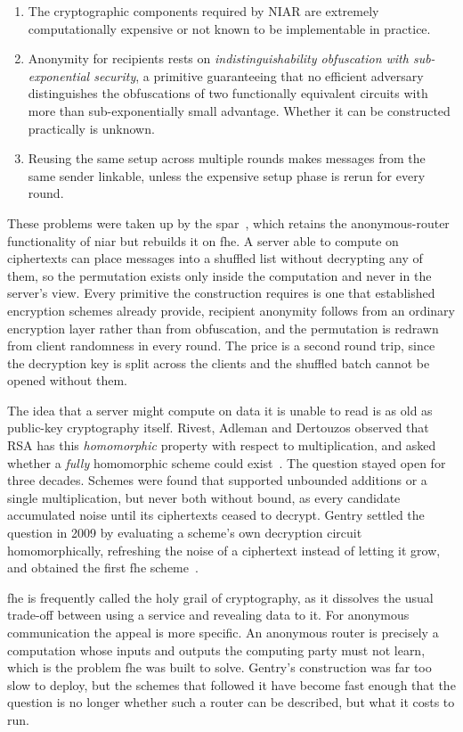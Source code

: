 \begin{enumerate}
    \item The cryptographic components required by NIAR are extremely computationally expensive or not known to be implementable in practice.
    \item Anonymity for recipients rests on \emph{indistinguishability obfuscation with sub-exponential security}, a primitive guaranteeing that no efficient adversary distinguishes the obfuscations of two functionally equivalent circuits with more than sub-exponentially small advantage. Whether it can be constructed practically is unknown.
    \item Reusing the same setup across multiple rounds makes messages from the same sender linkable, unless the expensive setup phase is rerun for every round.
\end{enumerate}

These problems were taken up by the \gls{spar}~\cite{cryptoeprint:2025/860}, which retains the anonymous-router functionality of \gls{niar} but rebuilds it on \gls{fhe}. A server able to compute on ciphertexts can place messages into a shuffled list without decrypting any of them, so the permutation exists only inside the computation and never in the server's view. Every primitive the construction requires is one that established encryption schemes already provide, recipient anonymity follows from an ordinary encryption layer rather than from obfuscation, and the permutation is redrawn from client randomness in every round. The price is a second round trip, since the decryption key is split across the clients and the shuffled batch cannot be opened without them.

The idea that a server might compute on data it is unable to read is as old as public-key cryptography itself. Rivest, Adleman and Dertouzos observed that RSA has this \emph{homomorphic} property with respect to multiplication, and asked whether a \emph{fully} homomorphic scheme could exist~\cite{rivest:1978:databanks}. The question stayed open for three decades. Schemes were found that supported unbounded additions or a single multiplication, but never both without bound, as every candidate accumulated noise until its ciphertexts ceased to decrypt. Gentry settled the question in 2009 by evaluating a scheme's own decryption circuit homomorphically, refreshing the noise of a ciphertext instead of letting it grow, and obtained the first \gls{fhe} scheme~\cite{gentry:2009}.

\gls{fhe} is frequently called the holy grail of cryptography, as it dissolves the usual trade-off between using a service and revealing data to it. For anonymous communication the appeal is more specific. An anonymous router is precisely a computation whose inputs and outputs the computing party must not learn, which is the problem \gls{fhe} was built to solve. Gentry's construction was far too slow to deploy, but the schemes that followed it have become fast enough that the question is no longer whether such a router can be described, but what it costs to run.

